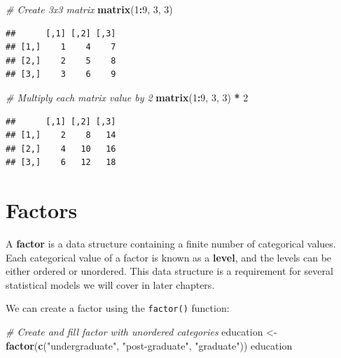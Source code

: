 \documentclass[]{book}
\newenvironment{Shaded}{\begin{snugshade}}{\end{snugshade}}
\newcommand{\CommentTok}[1]{\textcolor[rgb]{0.56,0.35,0.01}{\textit{#1}}}
\newcommand{\DecValTok}[1]{\textcolor[rgb]{0.00,0.00,0.81}{#1}}
\newcommand{\KeywordTok}[1]{\textcolor[rgb]{0.13,0.29,0.53}{\textbf{#1}}}
\newcommand{\NormalTok}[1]{#1}
\newcommand{\OperatorTok}[1]{\textcolor[rgb]{0.81,0.36,0.00}{\textbf{#1}}}
\newcommand{\StringTok}[1]{\textcolor[rgb]{0.31,0.60,0.02}{#1}}
\begin{document}
\begin{Shaded}
\begin{Highlighting}[]
\CommentTok{# Create 3x3 matrix}
\KeywordTok{matrix}\NormalTok{(}\DecValTok{1}\OperatorTok{:}\DecValTok{9}\NormalTok{, }\DecValTok{3}\NormalTok{, }\DecValTok{3}\NormalTok{)}
\end{Highlighting}
\end{Shaded}

\begin{verbatim}
##      [,1] [,2] [,3]
## [1,]    1    4    7
## [2,]    2    5    8
## [3,]    3    6    9
\end{verbatim}

\begin{Shaded}
\begin{Highlighting}[]
\CommentTok{# Multiply each matrix value by 2}
\KeywordTok{matrix}\NormalTok{(}\DecValTok{1}\OperatorTok{:}\DecValTok{9}\NormalTok{, }\DecValTok{3}\NormalTok{, }\DecValTok{3}\NormalTok{) }\OperatorTok{*}\StringTok{ }\DecValTok{2}
\end{Highlighting}
\end{Shaded}

\begin{verbatim}
##      [,1] [,2] [,3]
## [1,]    2    8   14
## [2,]    4   10   16
## [3,]    6   12   18
\end{verbatim}

\hypertarget{factors}{%
\section{Factors}\label{factors}}

A \textbf{factor} is a data structure containing a finite number of categorical values. Each categorical value of a factor is known as a \textbf{level}, and the levels can be either ordered or unordered. This data structure is a requirement for several statistical models we will cover in later chapters.

We can create a factor using the \texttt{factor()} function:

\begin{Shaded}
\begin{Highlighting}[]
\CommentTok{# Create and fill factor with unordered categories}
\NormalTok{education <-}\StringTok{ }\KeywordTok{factor}\NormalTok{(}\KeywordTok{c}\NormalTok{(}\StringTok{"undergraduate"}\NormalTok{, }\StringTok{"post-graduate"}\NormalTok{, }\StringTok{"graduate"}\NormalTok{))}
\NormalTok{education}
\end{Highlighting}
\end{Shaded}
\end{document}
